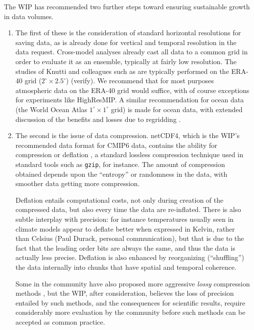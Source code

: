 \documentclass[gmd,manuscript]{copernicus}
\newcommand{\bibref}[1] { \cite{ref:#1}}
\newcommand{\pipref}[1] {\citep{ref:#1}}
\begin{document}
The WIP has recommended two further steps toward ensuring sustainable
growth in data volumes.

\begin{enumerate}
\item The first of these is the consideration of standard horizontal
  resolutions for saving data, as is already done for vertical and
  temporal resolution in the data request. Cross-model analyses
  already cast all data to a common grid in order to evaluate it as an
  ensemble, typically at fairly low resolution. The studies of Knutti
  and colleagues such as \bibref{knuttietal2017} are typically
  performed on the ERA-40 grid ($2^\circ\times 2.5^\circ$) (verify).
  We recommend that for most purposes atmospheric data on the ERA-40
  grid would suffice, with of course exceptions for experiments like
  HighResMIP. A similar recommendation for ocean data (the World Ocean
  Atlas $1^\circ\times 1^\circ$ grid) is made for ocean data, with
  extended discussion of the benefits and losses due to regridding
  \citep[see][]{ref:griffiesetal2014,ref:griffiesetal2016}.
\item The second is the issue of data compression. netCDF4, which is
  the WIP's recommended data format for CMIP6 data, contains the
  ability for compression or deflation \pipref{zivlempel1977}, a
  standard lossless compression technique used in standard tools such
  as \texttt{gzip}, for instance. The amount of compression obtained
  depends upon the ``entropy'' or randomness in the data, with
  smoother data getting more compression.

  Deflation entails computational costs, not only during creation of
  the compressed data, but also every time the data are re-inflated.
  There is also subtle interplay with precision: for instance
  temperatures usually seen in climate models appear to deflate better
  when expressed in Kelvin, rather than Celsius (Paul Durack, personal
  communication), but that is due to the fact that the leading order
  bits are always the same, and thus the data is actually less
  precise. Deflation is also enhanced by reorganizing (``shuffling'')
  the data internally into chunks that have spatial and temporal
  coherence.

  Some in the community have also proposed more aggressive
  \emph{lossy} compression methods \pipref{bakeretal2016}, but the
  WIP, after consideration, believes the loss of precision entailed by
  such methods, and the consequences for scientific results, require
  considerably more evaluation by the community before such methods
  can be accepted as common practice.


\end{enumerate}
\end{document}
